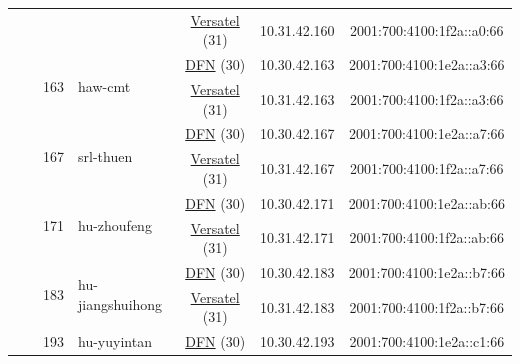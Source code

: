 \begin{small}
\begin{center}
\begin{longtable}{|c|c|c|c|c|c|c|c|}
  &  &  &  & \multicolumn{2}{|c|}{\tiny{\href{http://www.versatel.de}{Versatel} (31)}} & \tiny{10.31.42.160} & \tiny{2001:700:4100:1f2a::a0:66} \\* \cline{3-3}\cline{4-4}\cline{5-5}\cline{6-6}\cline{7-7}\cline{8-8}
  &  & \multirow{2}{*}{\tiny{163}} & \multicolumn{1}{|l|}{\multirow{2}{*}{\tiny{haw-cmt}}} & \multicolumn{2}{|c|}{\tiny{\href{https://www.dfn.de}{DFN} (30)}} & \tiny{10.30.42.163} & \tiny{2001:700:4100:1e2a::a3:66} \\* \cline{5-5}\cline{6-6}\cline{7-7}\cline{8-8}
  &  &  &  & \multicolumn{2}{|c|}{\tiny{\href{http://www.versatel.de}{Versatel} (31)}} & \tiny{10.31.42.163} & \tiny{2001:700:4100:1f2a::a3:66} \\* \cline{3-3}\cline{4-4}\cline{5-5}\cline{6-6}\cline{7-7}\cline{8-8}
  &  & \multirow{2}{*}{\tiny{167}} & \multicolumn{1}{|l|}{\multirow{2}{*}{\tiny{srl-thuen}}} & \multicolumn{2}{|c|}{\tiny{\href{https://www.dfn.de}{DFN} (30)}} & \tiny{10.30.42.167} & \tiny{2001:700:4100:1e2a::a7:66} \\* \cline{5-5}\cline{6-6}\cline{7-7}\cline{8-8}
  &  &  &  & \multicolumn{2}{|c|}{\tiny{\href{http://www.versatel.de}{Versatel} (31)}} & \tiny{10.31.42.167} & \tiny{2001:700:4100:1f2a::a7:66} \\* \cline{3-3}\cline{4-4}\cline{5-5}\cline{6-6}\cline{7-7}\cline{8-8}
  &  & \multirow{2}{*}{\tiny{171}} & \multicolumn{1}{|l|}{\multirow{2}{*}{\tiny{hu-zhoufeng}}} & \multicolumn{2}{|c|}{\tiny{\href{https://www.dfn.de}{DFN} (30)}} & \tiny{10.30.42.171} & \tiny{2001:700:4100:1e2a::ab:66} \\* \cline{5-5}\cline{6-6}\cline{7-7}\cline{8-8}
  &  &  &  & \multicolumn{2}{|c|}{\tiny{\href{http://www.versatel.de}{Versatel} (31)}} & \tiny{10.31.42.171} & \tiny{2001:700:4100:1f2a::ab:66} \\* \cline{3-3}\cline{4-4}\cline{5-5}\cline{6-6}\cline{7-7}\cline{8-8}
  &  & \multirow{2}{*}{\tiny{183}} & \multicolumn{1}{|l|}{\multirow{2}{*}{\tiny{hu-jiangshuihong}}} & \multicolumn{2}{|c|}{\tiny{\href{https://www.dfn.de}{DFN} (30)}} & \tiny{10.30.42.183} & \tiny{2001:700:4100:1e2a::b7:66} \\* \cline{5-5}\cline{6-6}\cline{7-7}\cline{8-8}
  &  &  &  & \multicolumn{2}{|c|}{\tiny{\href{http://www.versatel.de}{Versatel} (31)}} & \tiny{10.31.42.183} & \tiny{2001:700:4100:1f2a::b7:66} \\* \cline{3-3}\cline{4-4}\cline{5-5}\cline{6-6}\cline{7-7}\cline{8-8}
  &  & \multirow{2}{*}{\tiny{193}} & \multicolumn{1}{|l|}{\multirow{2}{*}{\tiny{hu-yuyintan}}} & \multicolumn{2}{|c|}{\tiny{\href{https://www.dfn.de}{DFN} (30)}} & \tiny{10.30.42.193} & \tiny{2001:700:4100:1e2a::c1:66} \\* \cline{5-5}\cline{6-6}\cline{7-7}\cline{8-8}

\end{longtable}
\end{center}
\end{small}
